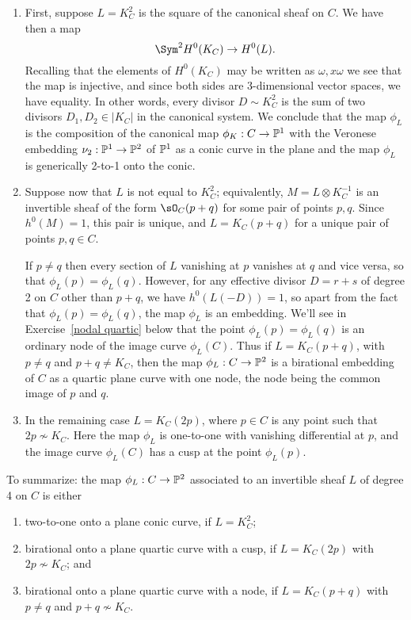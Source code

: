 \begin{enumerate}
\item First, suppose $L = K_C^2$ is  the square of the canonical sheaf on $C$. We have then a map
$$
\Sym^2 H^0(K_C) \to H^0(L).
$$
Recalling that the elements of $H^0(K_C)$ may be written as $\omega, x\omega$ we see that
the map is injective, and since both sides are 3-dimensional vector spaces, we have equality. In other words, every divisor $D \sim K_C^2$ is the sum of two divisors $D_1, D_2 \in |K_C|$ in the canonical system. We conclude that the map $\phi_L$ is the composition of the canonical map $\phi_K : C \to \PP^1$ with the Veronese embedding $\nu_2 : \PP^1 \to \PP^2$ of $\PP^1$ as a conic curve in the plane and the map $\phi_L$ is generically 2-to-1 onto the conic.

\item Suppose now that $L$ is not equal to $K_C^2$; equivalently, $M = L \otimes K_C^{-1}$ is an invertible sheaf
of the form $\sO_C(p+q)$ for some pair of points $p,q$. Since $h^0(M) = 1$, this pair is unique, and $L = K_C(p+q)$ for a unique pair of points $p, q \in C$.

If $p \neq q$ then every section of $L$ vanishing at $p$ vanishes at $q$ and vice versa, so that $\phi_L(p) = \phi_L(q)$. However, for any effective divisor $D = r+s$ of degree 2 on $C$  other than $p+q$, we have $h^0(L(-D)) = 1$, so apart from the fact that $\phi_L(p) = \phi_L(q)$, the map $\phi_L$ is an embedding. We'll see in Exercise~\ref{nodal quartic} below that the point $\phi_L(p) = \phi_L(q)$ is an ordinary node of the image curve $\phi_L(C)$. Thus if $L = K_C(p+q)$, with $p \neq q$ and $p+q \neq K_C$, then the map $\phi_L : C \to \PP^2$ is a birational embedding of $C$ as a quartic plane curve with one node, the node being the common image of $p$ and $q$.

\item In the remaining case $L = K_C(2p)$, where $p \in C$ is any point such that $2p \not\sim K_C$. Here the map $\phi_L$ is one-to-one with vanishing differential at $p$, and the image curve $\phi_L(C)$ has  a cusp at the point $\phi_L(p)$.
\end{enumerate}

To summarize: the map $\phi_L : C \to \PP^2$ associated to an invertible sheaf $L$ of degree 4 on $C$ is either
\begin{enumerate}
\item two-to-one onto a plane conic curve, if $L = K_C^2$;
\item birational onto a plane quartic curve with a cusp, if $L = K_C(2p)$ with $2p \not\sim K_C$; and
\item birational onto a plane quartic curve with a node, if $L = K_C(p+q)$ with $p \neq q$ and $p+q \not\sim K_C$.
\end{enumerate}


